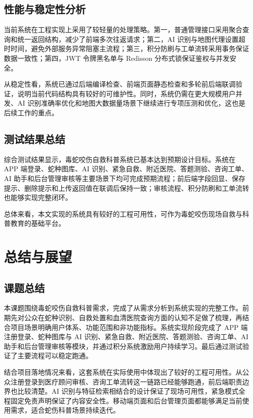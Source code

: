 \documentclass[12pt, a4paper, oneside]{ctexrep}
\begin{document}
\section{性能与稳定性分析}
当前系统在工程实现上采用了较轻量的处理策略。第一，普通管理接口采用聚合查询和统一返回结构，减少了前端多次往返请求；第二，AI 识别与地图代理设置超时时间，避免外部服务异常阻塞主流程；第三，积分防刷与工单流转采用事务保证数据一致性；第四，JWT 令牌黑名单与 Redisson 分布式锁保证鉴权与并发安全。

从稳定性看，系统已通过后端编译检查、前端页面静态检查和多轮前后端联调验证，说明当前代码结构具有较好的可维护性。同时，系统仍需在更大规模用户并发、AI 识别准确率优化和地图大数据量场景下继续进行专项压测和优化，这也是后续工作的重点。

\section{测试结果总结}
综合测试结果显示，毒蛇咬伤自救科普系统已基本达到预期设计目标。系统在 APP 端登录、蛇种图库、AI 识别、紧急自救、附近医院、答题测验、咨询工单、AI 助手和后台管理审核等主要场景下均可完成预期流程；前后端字段回显、保存提示、删除提示和上传返回值在联调后保持一致；审核流程、积分防刷和工单流转也能够实现完整闭环。

总体来看，本文实现的系统具有较好的工程可用性，可作为毒蛇咬伤现场自救与科普教育的基础平台。

\chapter{总结与展望}

\section{课题总结}
本课题围绕毒蛇咬伤自救科普需求，完成了从需求分析到系统实现的完整工作。前期先对公众在蛇种识别、自救处置和血清医院查询方面的认知不足做了梳理，再结合项目场景明确用户体系、功能范围和非功能指标。系统实现阶段完成了 APP 端注册登录、蛇种图库与 AI 识别、紧急自救、附近医院、答题测验、咨询工单、AI 助手和后台管理审核等模块，并通过积分系统激励用户持续学习。最后通过测试验证了主要流程可以稳定跑通。

结合项目落地情况来看，这套系统在实际使用中体现出了较好的工程可用性。从公众注册登录到医疗顾问审核、咨询工单流转这一链路已经能够跑通，前后端职责边界也比较清楚。AI 识别与特征检索相结合的设计保证了现场可用性，紧急模式全程固定免责声明保证了内容安全性。移动端页面和后台管理页面都能够满足当前使用需求，适合蛇伤科普场景持续迭代。
\end{document}
